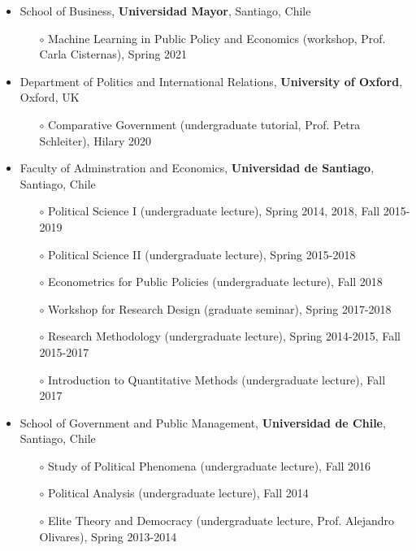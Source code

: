 \begin{publications}

\begin{itemize}
\item{\small School of Business, {\bfseries Universidad Mayor}, Santiago, Chile}
\begin{itemize}
\item[$\circ$]{\small Machine Learning in Public Policy and Economics (workshop, Prof. Carla Cisternas), Spring 2021}
\end{itemize}
\item{\small Department of Politics and International Relations, {\bfseries University of Oxford}, Oxford, UK}
\begin{itemize}
\item[$\circ$]{\small Comparative Government (undergraduate tutorial, Prof. Petra Schleiter), Hilary 2020}
\end{itemize}
\item{\small Faculty of Adminstration and Economics, {\bfseries Universidad de Santiago}, Santiago, Chile}
\begin{itemize}
\item[$\circ$]{\small Political Science I (undergraduate lecture), Spring 2014, 2018, Fall 2015-2019}
\item[$\circ$]{\small Political Science II (undergraduate lecture), Spring 2015-2018}
\item[$\circ$]{\small Econometrics for Public Policies (undergraduate lecture), Fall 2018}
\item[$\circ$]{\small Workshop for Research Design (graduate seminar), Spring 2017-2018}
\item[$\circ$]{\small Research Methodology (undergraduate lecture), Spring 2014-2015, Fall 2015-2017}
\item[$\circ$]{\small Introduction to Quantitative Methods (undergraduate lecture), Fall 2017}
\end{itemize}
\item{\small School of Government and Public Management, {\bfseries Universidad de Chile}, Santiago, Chile}
\begin{itemize}
\item[$\circ$]{\small Study of Political Phenomena (undergraduate lecture), Fall 2016}
\item[$\circ$]{\small Political Analysis (undergraduate lecture), Fall 2014}
\item[$\circ$]{\small Elite Theory and Democracy (undergraduate lecture, Prof. Alejandro Olivares), Spring 2013-2014}
\end{itemize}
\end{itemize}

\vspace{1mm}
\end{publications}
